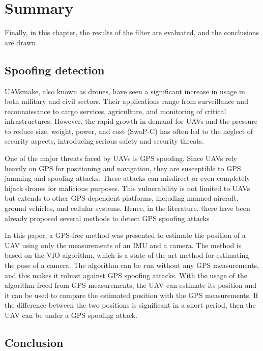 \chapter{Summary}\label{chap:conclusion}

Finally, in this chapter, the results of the filter are evaluated, and the conclusions are drawn.

\section{Spoofing detection}

UAVsmake, also known as drones, have seen a significant increase in usage in both military and civil sectors. Their applications range from surveillance and reconnaissance to cargo services, agriculture, and monitoring of critical infrastructures. However, the rapid growth in demand for UAVs and the pressure to reduce size, weight, power, and cost (SwaP-C) has often led to the neglect of security aspects, introducing serious safety and security threats.

One of the major threats faced by UAVs is GPS spoofing. Since UAVs rely heavily on GPS for positioning and navigation, they are susceptible to GPS jamming and spoofing attacks. These attacks can misdirect or even completely hijack drones for malicious purposes. This vulnerability is not limited to UAVs but extends to other GPS-dependent platforms, including manned aircraft, ground vehicles, and cellular systems. Hence, in the literature, there have been already proposed several methods to detect GPS spoofing attacks~\cite{spoofing-1, spoofing-2}.

In this paper, a GPS-free method was presented to estimate the position of a UAV using only the measurements of an IMU and a camera. The method is based on the VIO algorithm, which is a state-of-the-art method for estimating the pose of a camera. The algorithm can be run without any GPS measurements, and this makes it robust against GPS spoofing attacks. With the usage of the algorithm freed from GPS measurements, the UAV can estimate its position and it can be used to compare the estimated position with the GPS measurements. If the difference between the two positions is significant in a short period, then the UAV can be under a GPS spoofing attack.

\section{Conclusion}

